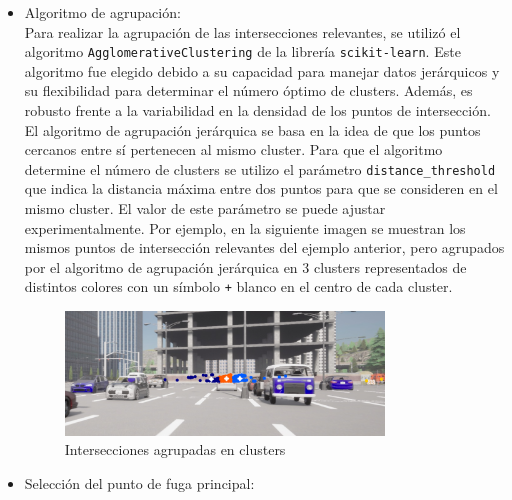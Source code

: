 \begin{itemize}
    \item Algoritmo de agrupación:\\

    Para realizar la agrupación de las intersecciones relevantes, se utilizó el algoritmo \texttt{AgglomerativeClustering} de la librería \texttt{scikit-learn}.
    Este algoritmo fue elegido debido a su capacidad para manejar datos jerárquicos y su flexibilidad para determinar el número óptimo de clusters. Además,
    es robusto frente a la variabilidad en la densidad de los puntos de intersección.
    El algoritmo de agrupación jerárquica se basa en la idea de que los puntos cercanos entre sí pertenecen al mismo cluster.
    Para que el algoritmo determine el número de clusters se utilizo el parámetro \texttt{distance\_threshold} que indica la distancia máxima
    entre dos puntos para que se consideren en el mismo cluster. El valor de este parámetro se puede ajustar experimentalmente.
    Por ejemplo, en la siguiente imagen se muestran los mismos puntos de intersección relevantes del ejemplo anterior,
    pero agrupados por el algoritmo de agrupación jerárquica en 3 clusters representados de distintos colores con un símbolo \texttt{+} blanco en el centro de cada cluster.
    \begin{figure}[!ht]
        \centering
        \includegraphics[width=0.8\textwidth]{img/reticule/AgglomerativeClustering}
        \caption{Intersecciones agrupadas en clusters}
        \label{fig:clusters}
    \end{figure}
    \item Selección del punto de fuga principal:\\


\end{itemize}
